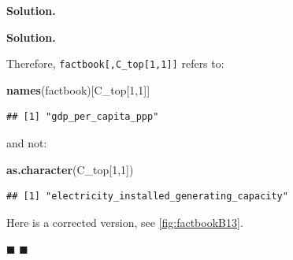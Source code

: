 \documentclass[10pt,b5paper,krantz1]{krantz}
\newenvironment{Shaded}{\begin{snugshade}}{\end{snugshade}}
\newcommand{\CommentTok}[1]{\textcolor[rgb]{0.37,0.37,0.37}{\textit{#1}}}
\newcommand{\DataTypeTok}[1]{\textcolor[rgb]{0.27,0.27,0.27}{#1}}
\newcommand{\DecValTok}[1]{\textcolor[rgb]{0.06,0.06,0.06}{#1}}
\newcommand{\KeywordTok}[1]{\textcolor[rgb]{0.27,0.27,0.27}{\textbf{#1}}}
\newcommand{\NormalTok}[1]{#1}
\newcommand{\OperatorTok}[1]{\textcolor[rgb]{0.43,0.43,0.43}{\textbf{#1}}}
\newcommand{\OtherTok}[1]{\textcolor[rgb]{0.37,0.37,0.37}{#1}}
\newcommand{\StringTok}[1]{\textcolor[rgb]{0.5,0.5,0.5}{#1}}
\newenvironment{solution}{%
\bigskip\noindent\textbf{Solution. }%
\it\ignorespaces%
\ignorespaces%
}{\ignorespaces%
\hfill$\blacksquare$%
}
\begin{document}
\begin{solution}
\begin{solution}
Therefore, \texttt{factbook{[},C\_top{[}1,1{]}{]}} refers to:

\begin{Shaded}
\begin{Highlighting}[]
\KeywordTok{names}\NormalTok{(factbook)[C_top[}\DecValTok{1}\NormalTok{,}\DecValTok{1}\NormalTok{]]}
\end{Highlighting}
\end{Shaded}

\begin{verbatim}
## [1] "gdp_per_capita_ppp"
\end{verbatim}

and not:

\begin{Shaded}
\begin{Highlighting}[]
\KeywordTok{as.character}\NormalTok{(C_top[}\DecValTok{1}\NormalTok{,}\DecValTok{1}\NormalTok{])}
\end{Highlighting}
\end{Shaded}

\begin{verbatim}
## [1] "electricity_installed_generating_capacity"
\end{verbatim}

Here is a corrected version, see \ref{fig:factbookB13}.

\begin{Shaded}
\end{Shaded}


\end{solution}
\end{solution}
\end{document}
